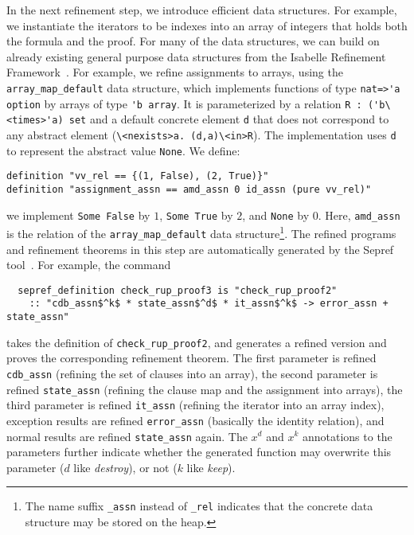 \documentclass{llncs}
\newcommand{\isai}{\lstinline[language=isabelle,basicstyle=\normalsize\ttfamily\slshape]}
\begin{document}
In the next refinement step, we introduce efficient data structures. For example, we instantiate the iterators to be indexes 
into an array of integers that holds both the formula and the proof. 
For many of the data structures, we can build on already existing general purpose data structures from the Isabelle Refinement Framework~\cite{La15,La16}.
For example, we refine assignments to arrays, using the \isai{array_map_default} data structure, which implements functions of type \isai{nat=>'a option} by
arrays of type \isai$'b array$. It is parameterized by a relation \isai$R : ('b\<times>'a) set$ and a default concrete element \isai$d$ that does not correspond to 
any abstract element (\isai$\<nexists>a. (d,a)\<in>R$). The implementation uses \isai$d$ to represent the abstract value \isai$None$.
We define:
\begin{lstlisting}
definition "vv_rel == {(1, False), (2, True)}"
definition "assignment_assn == amd_assn 0 id_assn (pure vv_rel)"
\end{lstlisting}
\ie we implement \isai{Some False} by $1$, \isai{Some True} by $2$, and \isai$None$ by $0$.
Here, \isai$amd_assn$ is the relation of the \isai$array_map_default$ data structure\footnote{The name suffix \isai$_assn$ instead of \isai$_rel$ 
indicates that the concrete data structure may be stored on the heap.}.
The refined programs and refinement theorems in this step are automatically generated by the Sepref tool~\cite{La15}. For example, the command
\begin{lstlisting}
  sepref_definition check_rup_proof3 is "check_rup_proof2"
    :: "cdb_assn$^k$ * state_assn$^d$ * it_assn$^k$ -> error_assn + state_assn"
\end{lstlisting}
takes the definition of \isai{check_rup_proof2}, and generates a refined version and proves the corresponding refinement theorem.
The first parameter is refined \wrt \isai{cdb_assn} (refining the set of clauses into an array), 
the second parameter is refined \wrt \isai{state_assn} (refining the clause map and the assignment into arrays), the third parameter is refined 
\wrt \isai{it_assn} (refining the iterator into an array index), exception results are 
refined \wrt \isai{error_assn} (basically the identity relation), and normal results are refined \wrt \isai{state_assn} again.
The $x^d$ and $x^k$ annotations to the parameters further indicate whether the generated function may overwrite this parameter ($d$ like {\em destroy}),
or not ($k$ like {\em keep}). 
\end{document}
